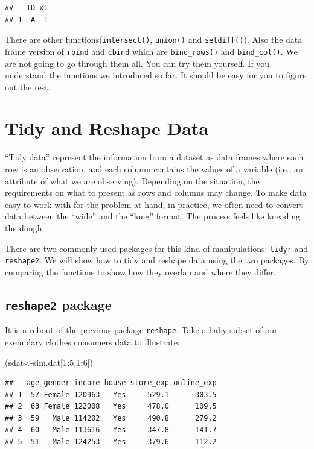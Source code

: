 \documentclass[12pt,]{krantz}
\newenvironment{Shaded}{\begin{snugshade}}{\end{snugshade}}
\newcommand{\DecValTok}[1]{\textcolor[rgb]{0.00,0.00,0.81}{#1}}
\newcommand{\OperatorTok}[1]{\textcolor[rgb]{0.81,0.36,0.00}{\textbf{#1}}}
\newcommand{\NormalTok}[1]{#1}
\theoremstyle{definition}
\theoremstyle{definition}
\theoremstyle{definition}
\theoremstyle{remark}
\begin{document}
\begin{verbatim}
##   ID x1
## 1  A  1
\end{verbatim}

There are other functions(\texttt{intersect()}, \texttt{union()} and
\texttt{setdiff()}). Also the data frame version of \texttt{rbind} and
\texttt{cbind} which are \texttt{bind\_rows()} and \texttt{bind\_col()}.
We are not going to go through them all. You can try them yourself. If
you understand the functions we introduced so far. It should be easy for
you to figure out the rest.

\section{Tidy and Reshape Data}\label{tidy-and-reshape-data}

``Tidy data'' represent the information from a dataset as data frames
where each row is an observation, and each column contains the values of
a variable (i.e., an attribute of what we are observing). Depending on
the situation, the requirements on what to present as rows and columns
may change. To make data easy to work with for the problem at hand, in
practice, we often need to convert data between the ``wide'' and the
``long'' format. The process feels like kneading the dough.

There are two commonly used packages for this kind of manipulations:
\texttt{tidyr} and \texttt{reshape2}. We will show how to tidy and
reshape data using the two packages. By comparing the functions to show
how they overlap and where they differ.

\subsection{\texorpdfstring{\texttt{reshape2}
package}{reshape2 package}}\label{reshape2-package}

It is a reboot of the previous package \texttt{reshape}. Take a baby
subset of our exemplary clothes consumers data to illustrate:

\begin{Shaded}
\begin{Highlighting}[]
\NormalTok{(sdat<-sim.dat[}\DecValTok{1}\OperatorTok{:}\DecValTok{5}\NormalTok{,}\DecValTok{1}\OperatorTok{:}\DecValTok{6}\NormalTok{])}
\end{Highlighting}
\end{Shaded}

\begin{verbatim}
##   age gender income house store_exp online_exp
## 1  57 Female 120963   Yes     529.1      303.5
## 2  63 Female 122008   Yes     478.0      109.5
## 3  59   Male 114202   Yes     490.8      279.2
## 4  60   Male 113616   Yes     347.8      141.7
## 5  51   Male 124253   Yes     379.6      112.2
\end{verbatim}
\end{document}

